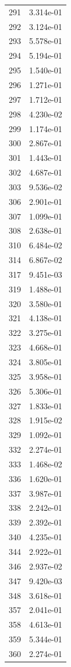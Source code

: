 \documentclass[12pt]{article}
\begin{document}
\begin{longtable}{@{}cc@{}}
291 & 3.314e-01 \\
292 & 3.124e-01 \\
293 & 5.578e-01 \\
294 & 5.194e-01 \\
295 & 1.540e-01 \\
296 & 1.271e-01 \\
297 & 1.712e-01 \\
298 & 4.230e-02 \\
299 & 1.174e-01 \\
300 & 2.867e-01 \\
301 & 1.443e-01 \\
302 & 4.687e-01 \\
303 & 9.536e-02 \\
306 & 2.901e-01 \\
307 & 1.099e-01 \\
308 & 2.638e-01 \\
310 & 6.484e-02 \\
314 & 6.867e-02 \\
317 & 9.451e-03 \\
319 & 1.488e-01 \\
320 & 3.580e-01 \\
321 & 4.138e-01 \\
322 & 3.275e-01 \\
323 & 4.668e-01 \\
324 & 3.805e-01 \\
325 & 3.958e-01 \\
326 & 5.306e-01 \\
327 & 1.833e-01 \\
328 & 1.915e-02 \\
329 & 1.092e-01 \\
332 & 2.274e-01 \\
333 & 1.468e-02 \\
336 & 1.620e-01 \\
337 & 3.987e-01 \\
338 & 2.242e-01 \\
339 & 2.392e-01 \\
340 & 4.235e-01 \\
344 & 2.922e-01 \\
346 & 2.937e-02 \\
347 & 9.420e-03 \\
348 & 3.618e-01 \\
357 & 2.041e-01 \\
358 & 4.613e-01 \\
359 & 5.344e-01 \\
360 & 2.274e-01 \\

\end{longtable}
\end{document}
